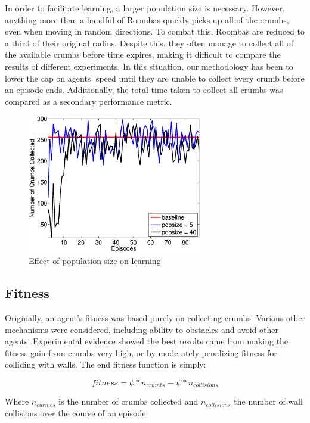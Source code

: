 \documentclass[conference]{IEEEtran}
\begin{document}
In order to facilitate learning, a larger population size is necessary. However, anything more than a handful of Roombas quickly picks up all of the crumbs, even when moving in random directions. To combat this, Roombas are reduced to a third of their original radius. Despite this, they often manage to collect 
all of the available crumbs before time expires, making it difficult to compare the results of different experiments. In this situation, our methodology has been to lower the cap on agents' speed until they are unable to collect every crumb before an episode ends. Additionally, the total time taken to collect all crumbs was compared as a secondary performance metric.


\begin{figure}[!t]
\centering
\includegraphics[width=3.0in]{./figures/neroevolution/pop_size.eps}
\caption{Effect of population size on learning}
\label{neroevolution:pop_size}
\end{figure}




\subsection{Fitness}
Originally, an agent's fitness was based purely on collecting crumbs. Various other mechanisms were considered, including ability to obstacles and avoid other agents. Experimental evidence showed the best results came from making the fitness gain from crumbs very high, or by moderately penalizing fitness for colliding with walls. The end fitness function is simply:


\[ fitness = \phi * n_{crumbs} - \psi * n_{collisions}\]

Where $n_{curmbs}$ is the number of crumbs collected and $n_{collisions}$ the number of wall collisions over the course of an episode. 
 
\end{document}
